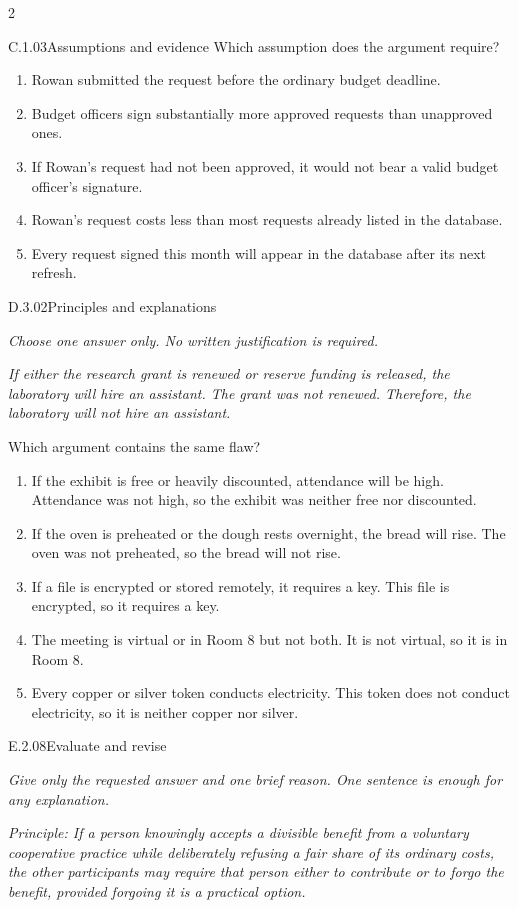 \documentclass[9pt]{extarticle}
\newcommand{\choice}[1]{\item #1}
\begin{document}
\begin{multicols}{2}
\begin{DenseCoreProblem}{C.1.03}{Assumptions and evidence}
Which assumption does the argument require?
\begin{enumerate}[label=(\alph*)]
  \choice{Rowan submitted the request before the ordinary budget deadline.}
  \choice{Budget officers sign substantially more approved requests than unapproved ones.}
  \choice{If Rowan's request had not been approved, it would not bear a valid budget officer's signature.}
  \choice{Rowan's request costs less than most requests already listed in the database.}
  \choice{Every request signed this month will appear in the database after its next refresh.}
\end{enumerate}
\end{DenseCoreProblem}
\begin{DenseCoreProblem}{D.3.02}{Principles and explanations}
{\scriptsize\textit{Choose one answer only. No written justification is required.}\par}
\emph{If either the research grant is renewed or reserve funding is released, the laboratory will hire an assistant. The grant was not renewed. Therefore, the laboratory will not hire an assistant.}

Which argument contains the same flaw?
\begin{enumerate}[label=(\alph*)]
  \choice{If the exhibit is free or heavily discounted, attendance will be high. Attendance was not high, so the exhibit was neither free nor discounted.}
  \choice{If the oven is preheated or the dough rests overnight, the bread will rise. The oven was not preheated, so the bread will not rise.}
  \choice{If a file is encrypted or stored remotely, it requires a key. This file is encrypted, so it requires a key.}
  \choice{The meeting is virtual or in Room 8 but not both. It is not virtual, so it is in Room 8.}
  \choice{Every copper or silver token conducts electricity. This token does not conduct electricity, so it is neither copper nor silver.}
\end{enumerate}
\end{DenseCoreProblem}
\begin{DenseCoreProblem}{E.2.08}{Evaluate and revise}
{\scriptsize\textit{Give only the requested answer and one brief reason. One sentence is enough for any explanation.}\par}
\emph{Principle: If a person knowingly accepts a divisible benefit from a voluntary cooperative practice while deliberately refusing a fair share of its ordinary costs, the other participants may require that person either to contribute or to forgo the benefit, provided forgoing it is a practical option.}


\end{DenseCoreProblem}
\end{multicols}
\end{document}

